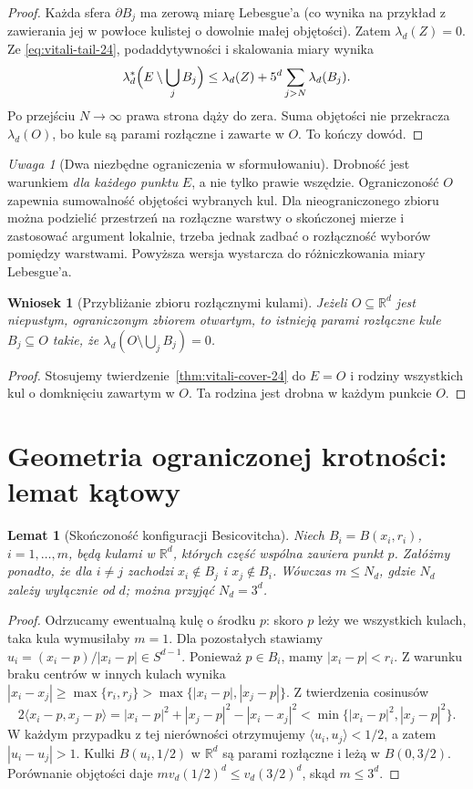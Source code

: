 \documentclass[11pt,a4paper,oneside]{book}
\numberwithin{equation}{chapter}
\theoremstyle{plain}
\newtheorem{lemat}[twierdzenie]{Lemat}
\newtheorem{wniosek}[twierdzenie]{Wniosek}
\theoremstyle{definition}
\theoremstyle{remark}
\newtheorem{uwaga}[twierdzenie]{Uwaga}
\begin{document}
\begin{proof}
Każda sfera $\partial B_j$ ma zerową miarę Lebesgue'a
(co wynika na przykład z zawierania jej w powłoce kulistej
o dowolnie małej objętości). Zatem $\lambda_d(Z)=0$.
Ze \eqref{eq:vitali-tail-24}, podaddytywności i skalowania
miary wynika
\[
 \lambda_d^*\Bigl(E\setminus\bigcup_jB_j\Bigr)
 \le\lambda_d(Z)+5^d\sum_{j>N}\lambda_d(B_j).
\]
Po przejściu $N\to\infty$ prawa strona dąży do zera.
Suma objętości nie przekracza $\lambda_d(O)$, bo kule są
parami rozłączne i zawarte w $O$. To kończy dowód.
\end{proof}

\begin{uwaga}[Dwa niezbędne ograniczenia w sformułowaniu]
Drobność jest warunkiem \emph{dla każdego punktu} $E$,
a nie tylko prawie wszędzie. Ograniczoność $O$ zapewnia
sumowalność objętości wybranych kul. Dla nieograniczonego
zbioru można podzielić przestrzeń na rozłączne warstwy
o skończonej mierze i zastosować argument lokalnie,
trzeba jednak zadbać o rozłączność wyborów pomiędzy warstwami.
Powyższa wersja wystarcza do różniczkowania miary Lebesgue'a.
\end{uwaga}

\begin{wniosek}[Przybliżanie zbioru rozłącznymi kulami]
\label{cor:vitali-open-24}
Jeżeli $O\subseteq\mathbb R^d$ jest niepustym,
ograniczonym zbiorem otwartym, to istnieją parami rozłączne
kule $B_j\subseteq O$ takie, że
$\lambda_d(O\setminus\bigcup_jB_j)=0$.
\end{wniosek}
\begin{proof}
Stosujemy twierdzenie~\ref{thm:vitali-cover-24} do $E=O$
i rodziny wszystkich kul o domknięciu zawartym w $O$.
Ta rodzina jest drobna w każdym punkcie $O$.
\end{proof}

\section{Geometria ograniczonej krotności: lemat kątowy}
\begin{lemat}[Skończoność konfiguracji Besicovitcha]
\label{lem:besicovitch-angle-24}
Niech $B_i=B(x_i,r_i)$, $i=1,\ldots,m$, będą kulami
w $\mathbb R^d$, których część wspólna zawiera punkt $p$.
Załóżmy ponadto, że dla $i\ne j$ zachodzi
$x_i\notin B_j$ i $x_j\notin B_i$.
Wówczas $m\le N_d$, gdzie $N_d$ zależy wyłącznie od $d$;
można przyjąć $N_d=3^d$.
\end{lemat}
\begin{proof}
Odrzucamy ewentualną kulę o środku $p$: skoro $p$ leży
we wszystkich kulach, taka kula wymusiłaby $m=1$.
Dla pozostałych stawiamy $u_i=(x_i-p)/|x_i-p|\in S^{d-1}$.
Ponieważ $p\in B_i$, mamy $|x_i-p|<r_i$.
Z warunku braku centrów w innych kulach wynika
$|x_i-x_j|\ge\max\{r_i,r_j\}>
\max\{|x_i-p|,|x_j-p|\}$.
Z twierdzenia cosinusów
\[
 2\langle x_i-p,x_j-p\rangle
 =|x_i-p|^2+|x_j-p|^2-|x_i-x_j|^2
 <\min\{|x_i-p|^2,|x_j-p|^2\}.
\]
W każdym przypadku z tej
nierówności otrzymujemy
$\langle u_i,u_j\rangle<1/2$, a zatem
$|u_i-u_j|>1$. Kulki $B(u_i,1/2)$ w $\mathbb R^d$
są parami rozłączne i leżą w $B(0,3/2)$.
Porównanie objętości daje
$m v_d(1/2)^d\le v_d(3/2)^d$, skąd $m\le3^d$.
\end{proof}
\end{document}
